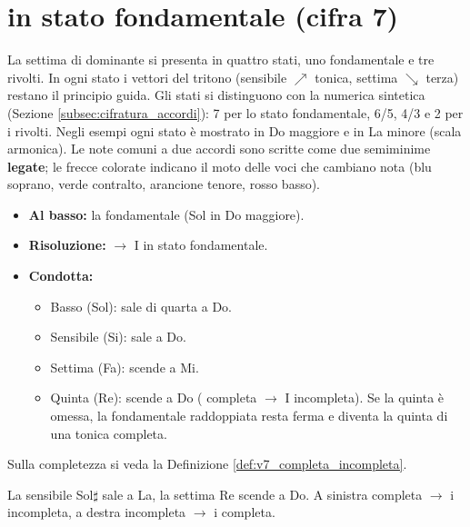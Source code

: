 \section{ in stato fondamentale (cifra 7)}
\label{subsec:v7_fondamentale}

La settima di dominante si presenta in quattro stati, uno fondamentale e tre rivolti. In ogni stato i vettori del tritono (sensibile $\nearrow$ tonica, settima $\searrow$ terza) restano il principio guida. Gli stati si distinguono con la numerica sintetica (Sezione \ref{subsec:cifratura_accordi}): 7 per lo stato fondamentale, 6/5, 4/3 e 2 per i rivolti. Negli esempi ogni stato è mostrato in Do maggiore e in La minore (scala armonica). Le note comuni a due accordi sono scritte come due semiminime \textbf{legate}; le frecce colorate indicano il moto delle voci che cambiano nota (blu soprano, verde contralto, arancione tenore, rosso basso).

\begin{itemize}
    \item \textbf{Al basso:} la fondamentale (Sol in Do maggiore).
    \item \textbf{Risoluzione:} $\rightarrow$ I in stato fondamentale.
    \item \textbf{Condotta:}
    \begin{itemize}
        \item Basso (Sol): sale di quarta a Do.
        \item Sensibile (Si): sale a Do.
        \item Settima (Fa): scende a Mi.
        \item Quinta (Re): scende a Do ( completa $\rightarrow$ I incompleta). Se la quinta è omessa, la fondamentale raddoppiata resta ferma e diventa la quinta di una tonica completa.
    \end{itemize}
\end{itemize}
Sulla completezza si veda la Definizione \ref{def:v7_completa_incompleta}.

\begin{esempio}
	\label{ex:v7_fond_minore}
	La sensibile Sol$\sharp$ sale a La, la settima Re scende a Do. A sinistra  completa $\rightarrow$ i incompleta, a destra  incompleta $\rightarrow$ i completa.
\end{esempio}

